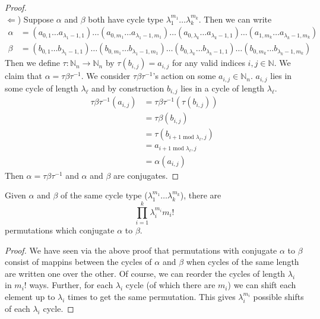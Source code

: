 \begin{proof}
	\text{}\\$\Leftarrow$) Suppose $\alpha$ and $\beta$ both have cycle
		type $\lambda_1^{m_1}\dots\lambda_k^{m_k}$. Then we can write
		\begin{align*}
			\alpha & = (a_{0,1}\dots a_{\lambda_1-1, 1})\dots(a_{0,m_1}\dots
			a_{\lambda_1-1,m_1})\dots(a_{0,\lambda_k}\dots
			a_{\lambda_k-1,1})\dots(a_{1,m_k}\dots a_{\lambda_k-1,m_k})      \\
			\beta  & = (b_{0,1}\dots b_{\lambda_1-1,1})\dots(b_{0,m_1}\dots
			b_{\lambda_1-1,m_1})\dots(b_{0,\lambda_k}\dots
			b_{\lambda_k-1,1})\dots(b_{0,m_k}\dots b_{\lambda_k-1,m_k})
		\end{align*}
		Then we define $\tau:\mathbb{N}_n\to\mathbb{N}_n$ by $\tau(b_{i, j})
	= a_{i,j}$ for any valid indices $i,j\in\mathbb{N}$.
		We claim that $\alpha = \tau\beta\tau^{-1}$. We consider
	$\tau\beta\tau^{-1}$'s action on some $a_{i,j}\in\mathbb{N}_n$.
	$a_{i,j}$ lies in some cycle of length $\lambda_\ell$ and by
		construction $b_{i,j}$ lies in a cycle of length $\lambda_\ell$.
		\begin{align*}
			\tau\beta\tau^{-1}(a_{i,j}) & = \tau\beta\tau^{-1}(\tau(b_{i,j}))        \\
			                            & = \tau\beta(b_{i,j})                       \\
			                            & = \tau(b_{i+1\text{ mod }\lambda_\ell, j}) \\
			                            & = a_{i+1\text{ mod }\lambda_\ell, j}       \\
			                            & = \alpha(a_{i,j})
		\end{align*}
		Then $\alpha = \tau\beta\tau^{-1}$ and $\alpha$ and $\beta$ are conjugates.
\end{proof}
\begin{corr}
	Given $\alpha$ and $\beta$ of the same cycle type
	($\lambda_1^{m_1}\dots\lambda_k^{m_k}$), there are
	\[
		\prod_{i=1}^{k}\lambda_i^{m_i}m_i!
	\]
	permutations which conjugate $\alpha$ to $\beta$.
\end{corr}
\begin{proof}
	We have seen via the above proof that permutations with conjugate
	$\alpha$ to $\beta$ consist of mappins between the cycles of $\alpha$
	and $\beta$ when cycles of the same length are written one over the
	other. Of course, we can reorder the cycles of length $\lambda_i$ in
	$m_i!$ ways. Further, for each $\lambda_i$ cycle (of which there are
	$m_i$) we can shift each element up to $\lambda_i$ times to get the
	same permutation. This gives $\lambda_i^{m_i}$ possible shifts of
	each $\lambda_i$ cycle.
\end{proof}
